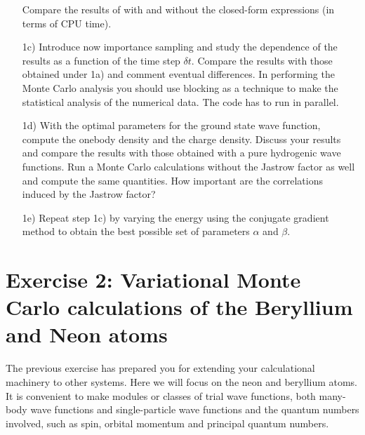 \documentclass[10pt]{article}
\begin{document}
\begin{enumerate}
Compare the results of with and without the closed-form expressions (in terms of CPU time).
\item[1c)] Introduce now importance sampling and study the dependence of the results as a function of the time step $\delta t$.  
Compare the results with those obtained under 1a) and comment eventual differences.
In performing the Monte Carlo analysis you should use blocking as a technique  to make the statistical analysis of the numerical data.
The code has to run in parallel. 
\item[1d)]  With the optimal parameters for the ground state wave function, compute the onebody density and
the charge density. Discuss your results and compare the results with those obtained with a pure hydrogenic wave functions. Run a Monte Carlo calculations without the Jastrow factor as well
and compute the same quantities. How important are the correlations induced by the Jastrow factor?

\item[1e)]  Repeat step 1c) by varying the energy using the 
conjugate gradient method to obtain the best possible set of parameters
$\alpha$ and $\beta$.

\end{enumerate}


\section*{Exercise 2: Variational Monte Carlo calculations of the Beryllium and  Neon atoms}
The previous exercise has prepared you for extending your calculational machinery  to other systems.
Here we will focus on the neon and beryllium atoms.
It is convenient to make modules or classes of trial wave functions, both many-body wave functions
and single-particle wave functions  and the quantum numbers  involved, such as spin, orbital momentum and principal
quantum numbers.
\end{document}

